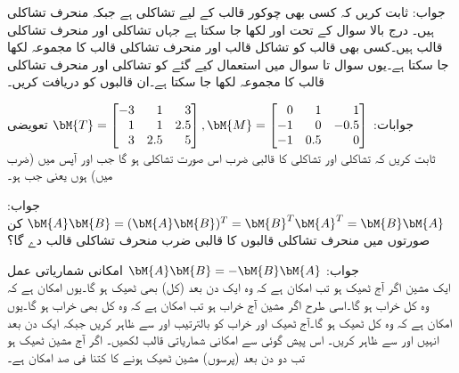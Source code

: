 جواب:
ثابت کریں  کہ کسی بھی چوکور قالب  کے لیے  تشاکلی ہے جبکہ  منحرف تشاکلی ہیں۔
درج بالا سوال کے تحت  اور  لکھا جا سکتا ہے جہاں  تشاکلی اور  منحرف تشاکلی قالب ہیں۔کسی بھی قالب کو تشاکل قالب اور منحرف تشاکلی قالب کا مجموعہ لکھا جا سکتا ہے۔یوں سوال  تا سوال  میں استعمال کیے گئے  کو تشاکلی اور منحرف تشاکلی قالب کا مجموعہ لکھا جا سکتا ہے۔ان قالبوں کو دریافت کریں۔

جوابات:
$\bM{T}=\begin{bmatrix*}[r] -3&1&3\\1&1&2.5\\3&2.5&5 \end{bmatrix*}, \bM{M}=\begin{bmatrix*}[r] 0&1&1\\-1&0&-0.5\\-1&0.5&0 \end{bmatrix*}$
\quad تعویضی\\
ثابت کریں کہ تشاکلی  اور تشاکلی  کا قالبی ضرب  اس صورت تشاکلی ہو گا جب  اور   آپس میں (ضرب میں)  ہوں یعنی جب  ہو۔

جواب:
$\bM{A}\bM{B}=(\bM{A}\bM{B})^T=\bM{B}^T\bM{A}^T=\bM{B}\bM{A}$
کن صورتوں میں منحرف تشاکلی قالبوں کا قالبی ضرب منحرف تشاکلی قالب دے گا؟

جواب:
$\bM{A}\bM{B}=-\bM{B}\bM{A}$
\quad امکانی شماریاتی عمل\\
ایک مشین اگر آج ٹھیک ہو تب  امکان ہے کہ وہ ایک دن بعد (کل) بھی ٹھیک ہو گا۔یوں  امکان ہے کہ وہ کل خراب ہو گا۔اسی طرح اگر مشین آج خراب ہو تب  امکان ہے کہ وہ کل بھی خراب ہو گا۔یوں  امکان ہے کہ وہ کل ٹھیک ہو گا۔آج ٹھیک اور خراب کو بالترتیب  اور  سے ظاہر کریں جبکہ ایک دن بعد انہیں  اور  سے ظاہر کریں۔ اس پیش گوئی سے امکانی شماریاتی قالب  لکھیں۔ اگر آج مشین ٹھیک ہو تب دو دن بعد (پرسوں) مشین ٹھیک ہونے کا کتنا فی صد امکان ہے۔ 

